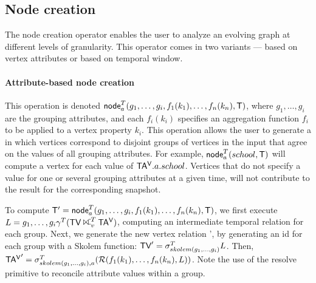 
\subsection{Node creation}
\label{sec:algebra:ncreate}

The node creation operator enables the user to analyze an evolving
graph at different levels of granularity.  This operator comes in two
variants --- based on vertex attributes or based on temporal window.

\paragraph*{Attribute-based node creation} This operation is denoted
$\textsf{node}^T_a(g_1,\ldots,g_i,f_1(k_1),\ldots,f_n(k_n),\mathsf{T})$,
where $g_1,\ldots,g_i$ are the grouping attributes, and each
$f_i(k_i)$ specifies an aggregation function $f_i$ to be applied to a
vertex property $k_i$.  This operation allows the user to generate a
\tg in which vertices correspond to disjoint groups of vertices in the
input that agree on the values of all grouping attributes.  For
example, $\textsf{node}^T_a(school,\mathsf{T})$ will compute a vertex for
each value of $\mathsf{TA^{V}}.a.school$.  Vertices that do not specify a value
for one or several grouping attributes at a given time, will not
contribute to the result for the corresponding snapshot.

To compute $\mathsf{T}' =
\textsf{node}^T_a(g_1,\ldots,g_i,f_1(k_1),\ldots,f_n(k_n),\mathsf{T})$, we
first execute $L = g_1,\ldots,g_i \gamma^T (\tv \rightouterjoin^T_v
\tav)$, computing an intermediate temporal relation for each group.
Next, we generate the new vertex relation \tv', by generating an id
for each group with a Skolem function: $\textsf{TV}' =
\sigma^T_{skolem(g_1,\ldots,g_i)}L$.  Then, $\mathsf{TA^{V}}' =
\sigma^T_{skolem(g_1,\ldots,g_i), a} (\mathcal{R}(f_1(k_1), \ldots,
  f_n(k_n),L))$.  Note the use of the resolve primitive to reconcile
attribute values within a group.

